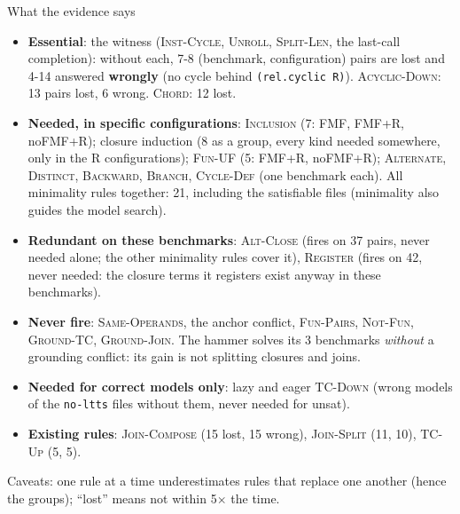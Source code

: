 \documentclass[aspectratio=169]{beamer}
\newcommand{\sm}[1]{\texttt{#1}}
\newcommand{\rn}[1]{\textsc{#1}}
\begin{document}
\begin{frame}{What the evidence says}
  \footnotesize
  \begin{itemize}
    \item \textbf{Essential}: the witness (\rn{Inst-Cycle}, \rn{Unroll}, \rn{Split-Len}, the
      last-call completion): without each, 7-8 (benchmark, configuration) pairs are lost and 4-14
      answered \textbf{wrongly} (no cycle behind \sm{(rel.cyclic R)}). \rn{Acyclic-Down}: 13 pairs
      lost, 6 wrong. \rn{Chord}: 12 lost.
    \item \textbf{Needed, in specific configurations}: \rn{Inclusion} (7: FMF, FMF+R, noFMF+R);
      closure induction (8 as a group, every kind needed somewhere, only in the R configurations);
      \rn{Fun-UF} (5: FMF+R, noFMF+R); \rn{Alternate}, \rn{Distinct}, \rn{Backward}, \rn{Branch},
      \rn{Cycle-Def} (one benchmark each). All minimality rules together: 21, including the
      satisfiable files (minimality also guides the model search).
    \item \textbf{Redundant on these benchmarks}: \rn{Alt-Close} (fires on 37 pairs, never needed
      alone; the other minimality rules cover it), \rn{Register} (fires on 42, never needed: the
      closure terms it registers exist anyway in these benchmarks).
    \item \textbf{Never fire}: \rn{Same-Operands}, the anchor conflict, \rn{Fun-Pairs},
      \rn{Not-Fun}, \rn{Ground-TC}, \rn{Ground-Join}. The hammer solves its 3 benchmarks
      \emph{without} a grounding conflict: its gain is not splitting closures and joins.
    \item \textbf{Needed for correct models only}: lazy and eager \rn{TC-Down} (wrong models of the
      \sm{no-ltts} files without them, never needed for unsat).
    \item \textbf{Existing rules}: \rn{Join-Compose} (15 lost, 15 wrong), \rn{Join-Split} (11, 10),
      \rn{TC-Up} (5, 5).
  \end{itemize}
  {\scriptsize Caveats: one rule at a time underestimates rules that replace one another (hence the
  groups); ``lost'' means not within 5$\times$ the time.\par}
\end{frame}
\end{document}
